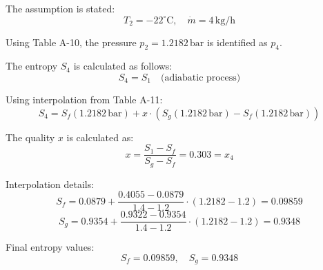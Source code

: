 The assumption is stated:  
\[
T_2 = -22^\circ\text{C}, \quad \dot{m} = 4 \, \text{kg/h}
\]  

Using Table A-10, the pressure \(p_2 = 1.2182 \, \text{bar}\) is identified as \(p_4\).  

The entropy \(S_4\) is calculated as follows:  
\[
S_4 = S_1 \quad \text{(adiabatic process)}
\]  

Using interpolation from Table A-11:  
\[
S_4 = S_f(1.2182 \, \text{bar}) + x \cdot \left(S_g(1.2182 \, \text{bar}) - S_f(1.2182 \, \text{bar})\right)
\]  

The quality \(x\) is calculated as:  
\[
x = \frac{S_1 - S_f}{S_g - S_f} = 0.303 = x_4
\]  

Interpolation details:  
\[
S_f = 0.0879 + \frac{0.4055 - 0.0879}{1.4 - 1.2} \cdot (1.2182 - 1.2) = 0.09859
\]  
\[
S_g = 0.9354 + \frac{0.9322 - 0.9354}{1.4 - 1.2} \cdot (1.2182 - 1.2) = 0.9348
\]  

Final entropy values:  
\[
S_f = 0.09859, \quad S_g = 0.9348
\]